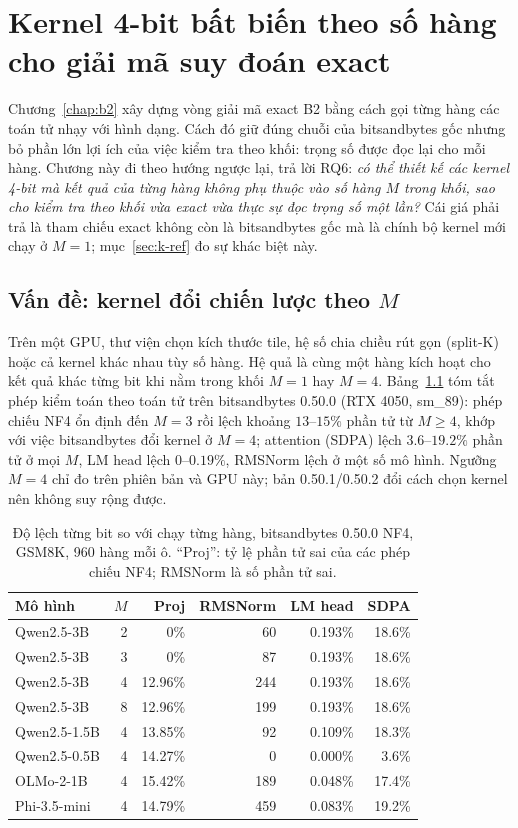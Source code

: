 \chapter{Kernel 4-bit bất biến theo số hàng cho giải mã suy đoán exact}\label{chap:kernel}

\providecommand{\code}[1]{\texttt{\detokenize{#1}}}
\providecommand{\ci}[3]{#1 [#2,\,#3]}

Chương~\ref{chap:b2} xây dựng vòng giải mã exact B2 bằng cách gọi từng hàng các toán tử nhạy với hình dạng. Cách đó giữ đúng chuỗi của bitsandbytes gốc nhưng bỏ phần lớn lợi ích của việc kiểm tra theo khối: trọng số được đọc lại cho mỗi hàng. Chương này đi theo hướng ngược lại, trả lời RQ6: \emph{có thể thiết kế các kernel 4-bit mà kết quả của từng hàng không phụ thuộc vào số hàng $M$ trong khối, sao cho kiểm tra theo khối vừa exact vừa thực sự đọc trọng số một lần?} Cái giá phải trả là tham chiếu exact không còn là bitsandbytes gốc mà là chính bộ kernel mới chạy ở $M{=}1$; mục~\ref{sec:k-ref} đo sự khác biệt này.

\section{Vấn đề: kernel đổi chiến lược theo $M$}\label{sec:k-problem}
Trên một GPU, thư viện chọn kích thước tile, hệ số chia chiều rút gọn (split-K) hoặc cả kernel khác nhau tùy số hàng. Hệ quả là cùng một hàng kích hoạt cho kết quả khác từng bit khi nằm trong khối $M{=}1$ hay $M{=}4$. Bảng~\ref{tab:k-audit} tóm tắt phép kiểm toán theo toán tử trên bitsandbytes 0.50.0 (RTX 4050, sm\_89): phép chiếu NF4 ổn định đến $M{=}3$ rồi lệch khoảng $13$--$15\%$ phần tử từ $M{\ge}4$, khớp với việc bitsandbytes đổi kernel ở $M{=}4$; attention (SDPA) lệch $3.6$--$19.2\%$ phần tử ở mọi $M$, LM head lệch $0$--$0.19\%$, RMSNorm lệch ở một số mô hình. Ngưỡng $M{=}4$ chỉ đo trên phiên bản và GPU này; bản 0.50.1/0.50.2 đổi cách chọn kernel nên không suy rộng được.

\begin{table}[t]
\centering\small
\caption{Độ lệch từng bit so với chạy từng hàng, bitsandbytes 0.50.0 NF4, GSM8K, 960 hàng mỗi ô. ``Proj'': tỷ lệ phần tử sai của các phép chiếu NF4; RMSNorm là số phần tử sai.}\label{tab:k-audit}
\begin{tabular}{@{}lrrrrr@{}}
\toprule
Mô hình & $M$ & Proj & RMSNorm & LM head & SDPA\\\midrule
Qwen2.5-3B & 2 & 0\% & 60 & 0.193\% & 18.6\%\\
Qwen2.5-3B & 3 & 0\% & 87 & 0.193\% & 18.6\%\\
Qwen2.5-3B & 4 & 12.96\% & 244 & 0.193\% & 18.6\%\\
Qwen2.5-3B & 8 & 12.96\% & 199 & 0.193\% & 18.6\%\\
Qwen2.5-1.5B & 4 & 13.85\% & 92 & 0.109\% & 18.3\%\\
Qwen2.5-0.5B & 4 & 14.27\% & 0 & 0.000\% & 3.6\%\\
OLMo-2-1B & 4 & 15.42\% & 189 & 0.048\% & 17.4\%\\
Phi-3.5-mini & 4 & 14.79\% & 459 & 0.083\% & 19.2\%\\
\bottomrule
\end{tabular}
\end{table}


